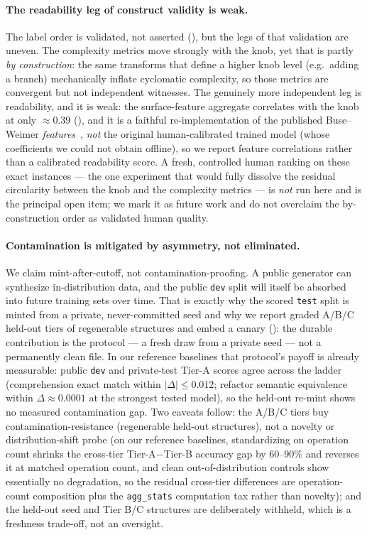 \paragraph{The readability leg of construct validity is weak.} The label order is
validated, not asserted (), but the legs of that validation are
uneven. The complexity metrics move strongly with the knob, yet that is partly
\emph{by construction}: the same transforms that define a higher knob level (e.g.\ adding
a branch) mechanically inflate cyclomatic complexity, so those metrics are convergent but
not independent witnesses. The genuinely more independent leg is readability, and it is
weak: the surface-feature aggregate correlates with the knob at only $\approx0.39$
(), and it is a faithful re-implementation of the published
Buse--Weimer \emph{features}~\citep{buse2010readability}, \emph{not} the original
human-calibrated trained model (whose coefficients we could not obtain offline), so we
report feature correlations rather than a calibrated readability score. A fresh,
controlled human ranking on these exact instances --- the one experiment that would fully
dissolve the residual circularity between the knob and the complexity metrics --- is
\emph{not} run here and is the principal open item; we mark it as future work and do not
overclaim the by-construction order as validated human quality.

\paragraph{Contamination is mitigated by asymmetry, not eliminated.} We claim
mint-after-cutoff, not contamination-proofing. A public generator can synthesize
in-distribution data, and the public \texttt{dev} split will itself be absorbed into
future training sets over time. That is exactly why the scored \texttt{test} split is
minted from a private, never-committed seed and why we report graded A/B/C held-out tiers
of regenerable structures and embed a canary (): the durable contribution is the protocol --- a
fresh draw from a private seed --- not a permanently clean file. In our reference baselines
that protocol's payoff is already measurable: public \texttt{dev} and private-test Tier-A
scores agree across the ladder (comprehension exact match within $|\Delta|\le0.012$;
refactor semantic equivalence within $\Delta\approx0.0001$ at the strongest tested model), so the held-out
re-mint shows no measured contamination gap. Two caveats follow: the A/B/C tiers buy
contamination-resistance (regenerable held-out structures), not a novelty or
distribution-shift probe (on our reference baselines, standardizing on operation count
shrinks the cross-tier Tier-A$-$Tier-B accuracy gap by $60$--$90\%$ and reverses it at
matched operation count, and clean out-of-distribution controls show essentially no
degradation, so the residual cross-tier differences are operation-count composition plus
the \texttt{agg\_stats} computation tax rather than novelty); and
the held-out seed and Tier B/C structures are deliberately withheld,
which is a freshness trade-off, not an oversight.

